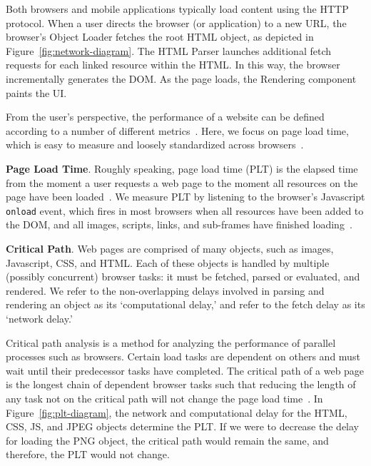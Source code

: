 Both browsers and mobile applications typically load content using the HTTP protocol. When a user directs the browser (or application) to a new URL, the browser's Object Loader fetches the root HTML object, as depicted
in Figure~\ref{fig:network-diagram}. The HTML Parser launches additional
fetch requests for each linked resource within the HTML. In this way, the browser incrementally generates the DOM.
As the page loads, the Rendering component paints the UI.

From the user's perspective, the performance of a website can be defined according to a number of different metrics~\cite{above-the-fold,speed-index}. Here,
we focus on page load time, which is easy to measure
and loosely standardized across browsers~\cite{w3c-onload}.

\textbf{Page Load Time}. Roughly speaking, page load time (PLT) is the elapsed time from the moment a user requests a web page to the moment all resources on the page have been loaded~\cite{page-speed}.
We measure PLT by listening to the browser's Javascript \texttt{onload} event,
which fires in most browsers when all resources have been added to the DOM, and all images,
scripts, links, and sub-frames have finished loading~\cite{w3c-onload}.



\textbf{Critical Path}. Web pages are comprised of many objects, such as images, Javascript, CSS, and HTML.
Each of these objects is handled by multiple (possibly concurrent) browser tasks: it must be
fetched, parsed or evaluated, and rendered. We refer to the non-overlapping
delays involved in parsing and rendering an object as its `computational
delay,' and refer to the fetch delay as its `network delay.'

Critical path analysis is a method for analyzing the performance of parallel
processes such as browsers.
Certain load tasks are dependent on others and must wait until their
predecessor tasks have completed. The critical path of a web page is the longest chain of dependent browser tasks such that reducing the length of any task not on the critical
path will not change the page load time~\cite{sarkar1987partitioning}.
In Figure~\ref{fig:plt-diagram}, the network and computational delay for the HTML, CSS, JS, and JPEG
objects determine the PLT. If we were to decrease the delay for loading the
PNG object, the critical path would remain the same, and therefore, the PLT would not change.

